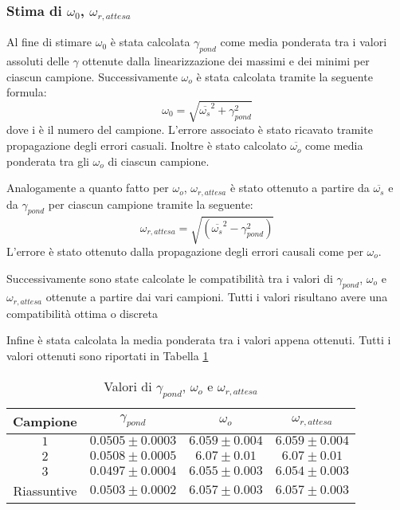 \documentclass[a4paper,11pt,oneside]{article}
\begin{document}
\subsubsection{Stima di $\omega_{0}$, $\omega_{r, attesa}$}
Al fine di stimare $\omega_{0}$ è stata calcolata $\gamma_{pond}$ come media ponderata tra i valori assoluti delle $\gamma$ ottenute dalla linearizzazione dei massimi e dei minimi per ciascun campione. Successivamente $\omega_o$ è stata calcolata tramite la seguente formula:
\begin{equation*}
    \omega_{0} = \sqrt{\overline{\omega_{s}}^2+\gamma_{pond}^2}
\end{equation*}
dove i è il numero del campione.
L'errore associato è stato ricavato tramite propagazione degli errori casuali.
Inoltre è stato calcolato $\overline{\omega_o}$ come media ponderata tra gli $\omega_o$ di ciascun campione.

Analogamente a quanto fatto per $\omega_o$, $\omega_{r,attesa}$ è stato ottenuto a partire da $\overline{\omega_s}$ e da $\gamma_{pond}$ per ciascun campione tramite la seguente: 
\begin{equation*}
    \omega_{r,attesa} = \sqrt{(\overline{\omega_{s}}^2-\gamma_{pond}^2)}
\end{equation*}
L'errore è stato ottenuto dalla propagazione degli errori causali come per $\omega_o$. 

Successivamente sono state calcolate le compatibilità tra i valori di $\gamma_{pond}$, $\omega_o$ e $\omega_{r,attesa}$ ottenute a partire dai vari campioni. Tutti i valori risultano avere una compatibilità ottima o discreta

Infine è stata calcolata la media ponderata tra i valori appena ottenuti. Tutti i valori ottenuti sono riportati in Tabella \ref{tab:valori_gamma_omega}

\begin{table}[h!]
    \centering
    \begin{tabular}{|c|c|c|c|}
        \hline
        Campione & $\gamma_{pond}$ & $\omega_o$ & $\omega_{r,attesa}$ \\ \hline
        \rowcolor[rgb]{0.85,0.85,0.85}$1$ & $0.0505\pm0.0003$ & $6.059\pm0.004$ & $6.059\pm0.004$ \\ \hline
        $2$ & $0.0508\pm0.0005$ & $6.07\pm0.01$ & $6.07\pm0.01$ \\ \hline
        \rowcolor[rgb]{0.85,0.85,0.85}$3$ & $0.0497\pm0.0004$ & $6.055\pm0.003$ & $6.054\pm0.003$ \\ \hline \hline
        Riassuntive & $0.0503\pm0.0002$ & $6.057\pm0.003$ & $6.057\pm0.003$ \\ \hline
    \end{tabular}
    \caption{Valori di $\gamma_{pond}$, $\omega_o$ e $\omega_{r,attesa}$}
    \label{tab:valori_gamma_omega}
\end{table}
\end{document}
